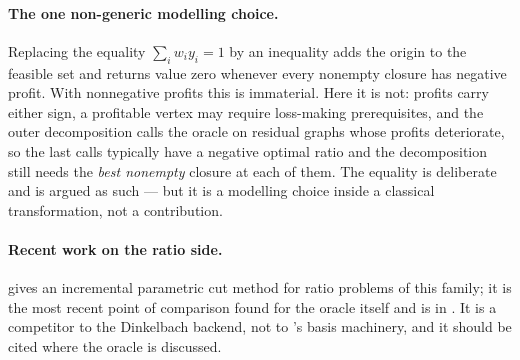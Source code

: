 \paragraph{The one non-generic modelling choice.} Replacing the equality
\(\sum_i w_i y_i = 1\) by an inequality adds the origin to the feasible set and
returns value zero whenever every nonempty closure has negative profit. With
nonnegative profits this is immaterial. Here it is not: profits carry either
sign, a profitable vertex may require loss-making prerequisites, and the outer
decomposition calls the oracle on residual graphs whose profits deteriorate, so
the last calls typically have a negative optimal ratio and the decomposition
still needs the \emph{best nonempty} closure at each of them. The equality is
deliberate and is argued as such --- but it is a modelling choice inside a
classical transformation, not a contribution.

\paragraph{Recent work on the ratio side.} \citet{Hochbaum2024} gives an
incremental parametric cut method for ratio problems of this family; it is the
most recent point of comparison found for the oracle itself and is in
. It is a competitor to the Dinkelbach backend, not to
\FSC{}'s basis machinery, and it should be cited where the oracle is discussed.

